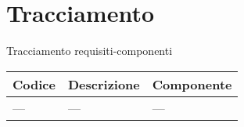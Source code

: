 %
%


\section{Tracciamento} %
\label{sec:tracciamento}

\begin{center}
Tracciamento requisiti-componenti

\begin{longtable}{| p{2cm} | p{6cm} | p{5cm} |}
\hline
\textbf{Codice} & \textbf{Descrizione} & \textbf{Componente} \\
\hline
---   &  --- & --- \\
\hline
\end{longtable}

\end{center}

